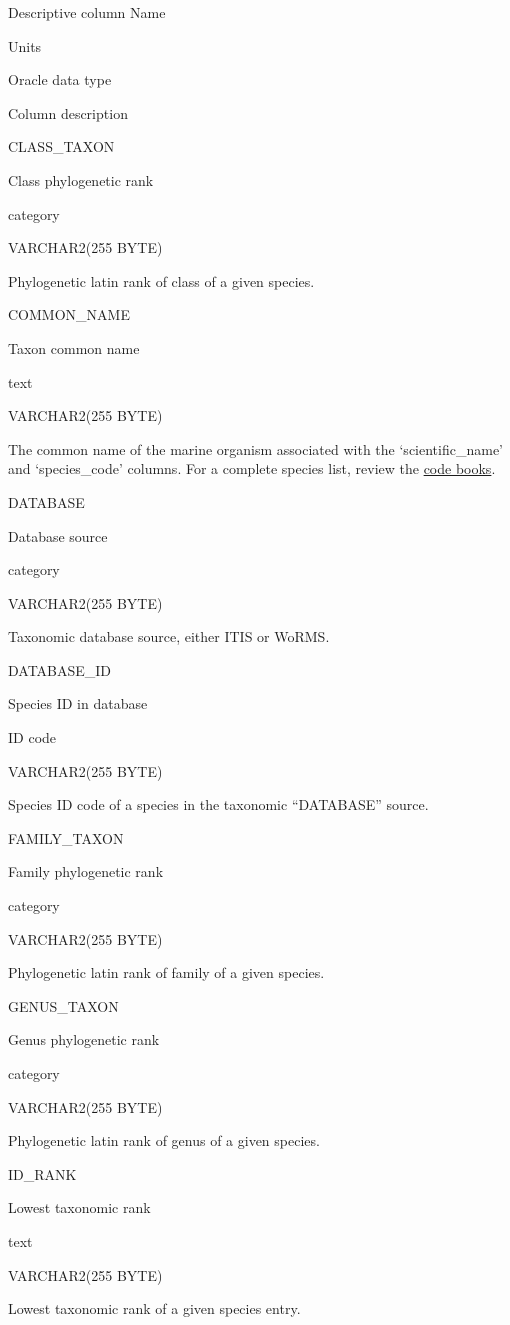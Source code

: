 \documentclass[
  letterpaper,
  oneside,
  open=any]{scrbook}
\begin{document}
Descriptive column Name

Units

Oracle data type

Column description

CLASS\_TAXON

Class phylogenetic rank

category

VARCHAR2(255 BYTE)

Phylogenetic latin rank of class of a given species.

COMMON\_NAME

Taxon common name

text

VARCHAR2(255 BYTE)

The common name of the marine organism associated with the
`scientific\_name' and `species\_code' columns. For a complete species
list, review the
\href{https://www.fisheries.noaa.gov/resource/document/groundfish-survey-species-code-manual-and-data-codes-manual}{code
books}.

DATABASE

Database source

category

VARCHAR2(255 BYTE)

Taxonomic database source, either ITIS or WoRMS.

DATABASE\_ID

Species ID in database

ID code

VARCHAR2(255 BYTE)

Species ID code of a species in the taxonomic ``DATABASE'' source.

FAMILY\_TAXON

Family phylogenetic rank

category

VARCHAR2(255 BYTE)

Phylogenetic latin rank of family of a given species.

GENUS\_TAXON

Genus phylogenetic rank

category

VARCHAR2(255 BYTE)

Phylogenetic latin rank of genus of a given species.

ID\_RANK

Lowest taxonomic rank

text

VARCHAR2(255 BYTE)

Lowest taxonomic rank of a given species entry.
\end{document}
